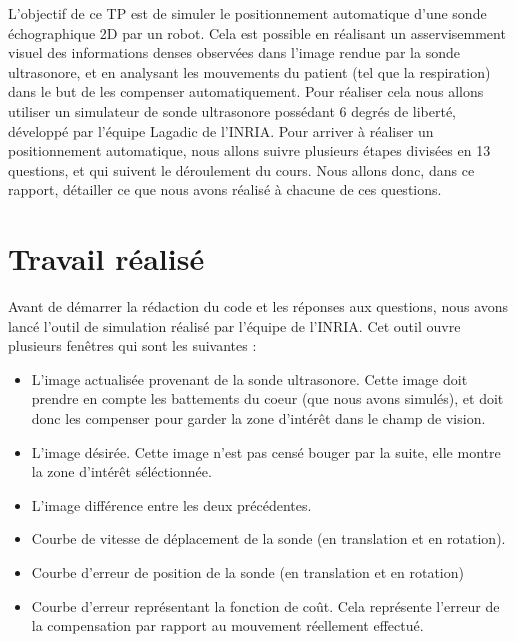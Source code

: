 \documentclass[a4paper,11pt]{article}
\begin{document}
L'objectif de ce TP est de simuler le positionnement automatique d'une sonde \'echographique 2D par un robot. Cela est possible en r\'ealisant un asservisemment visuel des informations denses observ\'ees dans l'image rendue par la sonde ultrasonore, et en analysant les mouvements du patient (tel que la respiration) dans le but de les compenser automatiquement.
Pour r\'ealiser cela nous allons utiliser un simulateur de sonde ultrasonore poss\'edant 6 degr\'es de libert\'e, d\'evelopp\'e par l'\'equipe Lagadic de l'INRIA. Pour arriver \`a r\'ealiser un positionnement automatique, nous allons suivre plusieurs \'etapes divis\'ees en 13 questions, et qui suivent le d\'eroulement du cours. Nous allons donc, dans ce rapport, d\'etailler ce que nous avons r\'ealis\'e \`a chacune de ces questions.


\section{Travail r\'ealis\'e}
Avant de d\'emarrer la r\'edaction du code et les r\'eponses aux questions, nous avons lanc\'e l'outil de simulation r\'ealis\'e par l'\'equipe de l'INRIA. Cet outil ouvre plusieurs fen\^etres qui sont les suivantes :
\begin{itemize}
\item L'image actualis\'ee provenant de la sonde ultrasonore. Cette image doit prendre en compte les battements du coeur (que nous avons simul\'es), et doit donc les compenser pour garder la zone d'int\'er\^et dans le champ de vision.
\item L'image d\'esir\'ee. Cette image n'est pas cens\'e bouger par la suite, elle montre la zone d'int\'er\^et s\'el\'ectionn\'ee.
\item L'image diff\'erence entre les deux pr\'ec\'edentes.
\item Courbe de vitesse de d\'eplacement de la sonde (en translation et en rotation).
\item Courbe d'erreur de position de la sonde (en translation et en rotation)
\item Courbe d'erreur repr\'esentant la fonction de co\^ut. Cela repr\'esente l'erreur de la compensation par rapport au mouvement r\'eellement effectu\'e.
\end{itemize}
\end{document}
